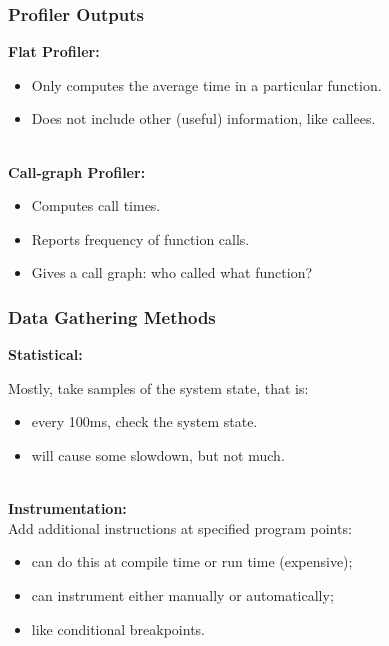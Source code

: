 \documentclass[aspectratio=43]{beamer}
\newenvironment{changemargin}[1]{%
  \begin{list}{}{%
    \setlength{\topsep}{0pt}%
    \setlength{\leftmargin}{#1}%
    \setlength{\rightmargin}{1em}
    \setlength{\listparindent}{\parindent}%
    \setlength{\itemindent}{\parindent}%
    \setlength{\parsep}{\parskip}%
  }%
  \item[]}{\end{list}}
\begin{document}
\begin{frame}
  \frametitle{Profiler Outputs}

  \begin{changemargin}{1.5cm}
  {\bf Flat Profiler:}

  \begin{itemize}
    \item Only computes the average time in a particular function.
    \item Does not include other (useful) information, like callees.
  \end{itemize}

~\\[1em]

  {\bf Call-graph Profiler:}

  \begin{itemize}
    \item Computes call times.
    \item Reports frequency of function calls.
    \item Gives a call graph: who called what function?
  \end{itemize}
  \end{changemargin}
\end{frame}

\begin{frame}
  \frametitle{Data Gathering Methods}

  \begin{changemargin}{2cm}
  {\bf Statistical:}

  Mostly, take samples of the system state, that is:
  \begin{itemize}
    \item every 100ms, check the system state.
    \item will cause some slowdown, but not much.
  \end{itemize}
~\\[1em]

  {\bf Instrumentation:}\\
  Add additional instructions at specified program points:
  \begin{itemize}
    \item can do this at compile time or run time (expensive);
    \item can instrument either manually or automatically;
    \item like conditional breakpoints.
  \end{itemize}
  \end{changemargin}
\end{frame}
\end{document}
